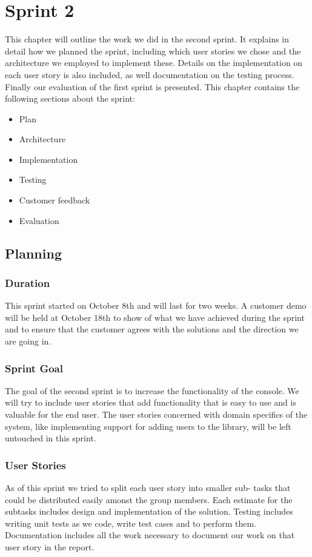 \chapter{Sprint 2}
This chapter will outline the work we did in the second sprint. It explains in detail how we planned the sprint, including which user stories we chose and the architecture we employed to implement these. Details on the implementation on each user story is also included, as well documentation on the testing process. Finally our evaluation of the first sprint is presented. This chapter contains the following sections about the sprint:
\begin{itemize}
\item Plan
\item Architecture
\item Implementation
\item Testing
\item Customer feedback
\item Evaluation
\end{itemize}

\section{Planning}

\subsection{Duration}
This sprint started on October 8th and will last for two weeks. A customer demo will be held at October 18th to show of what we have achieved during the sprint and to ensure that the customer agrees with the solutions and the direction we are going in.

\subsection{Sprint Goal}
The goal of the second sprint is to increase the functionality of the console. We will try to include user stories that add functionality that is easy to use and is valuable for the end user. The user stories concerned with domain specifics of the system, like implementing support for adding users to the library, will be left untouched in this sprint.

\subsection{User Stories}
As of this sprint we tried to split each user story into smaller sub- tasks that could be distributed easily amonst the group members. Each estimate for the subtasks includes design and implementation of the solution. Testing includes writing unit tests as we code, write test cases and to perform them. Documentation includes all the work necessary to document our work on that user story in the report.

